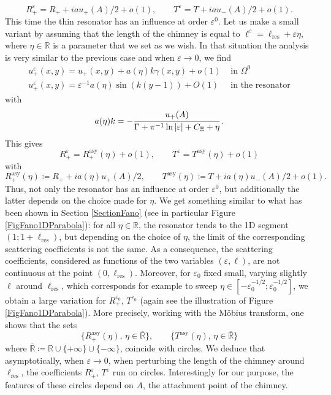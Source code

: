 \documentclass[11pt,a4paper]{report}
\newcommand{\eps}{\varepsilon}
\newcommand{\Om}{\Omega}
\newcommand{\mrm}[1]{\mathrm{#1}}
\newcommand{\R}{\mathbb{R}}
\begin{document}
\[
R_{+}^{\eps}=R_{+}+ia u_+(A)/2+o(1),\qquad T^{\eps}=T+iau_-(A)/2+o(1).
\]
This time the thin resonator has an influence at order $\eps^0$.  Let us make a small variant by assuming that the length of the chimney is equal to $\ell^\eps=\ell_{\mrm{res}}+\eps \eta$, where $\eta\in\R$ is a parameter that we set as we wish. In that situation the analysis is very similar to the previous case and when $\eps\to0$, we find
\begin{equation}\label{ResultAsymptoOut2}
\begin{array}{|ll}
u^{\eps}_+(x,y)=u_+(x,y)+a(\eta)k\gamma(x,y)+o(1) &\mbox{ in }\Om^0\\[4pt]
u^{\eps}_+(x,y)=\eps^{-1}a(\eta)\sin(k (y-1))+O(1) &\mbox{ in the resonator}
\end{array}
\end{equation}
with
\[
a(\eta) k=-\cfrac{u_+(A)}{\Gamma+\pi^{-1}\ln|\eps|+C_{\Xi}+\eta}\,.
\]
This gives
\begin{equation}\label{ExpansionsMainC}
R_{+}^{\eps}=R_{+}^{\mrm{asy}}(\eta)+o(1),\qquad T^{\eps}=T^{\mrm{asy}}(\eta)+o(1)
\end{equation}
with
\[
R_{+}^{\mrm{asy}}(\eta)\coloneqq R_{+}+ia(\eta)u_+(A)/2,\qquad T^{\mrm{asy}}(\eta)\coloneqq T+ia(\eta)u_-(A)/2+o(1).
\]
Thus, not only the resonator has an influence at order $\eps^0$, but additionally the latter depends on the choice made for $\eta$.  We get something similar to what has been shown in Section \ref{SectionFano} (see in particular Figure \ref{FigFano1DParabola}): for all $\eta\in\R$, the resonator tends to the 1D segment $(1;1+\ell_\mrm{res})$, but depending on the choice of $\eta$, the limit of the corresponding scattering coefficients is not the same. As a consequence, the scattering coefficients, considered as functions of the two variables $(\eps,\ell)$, are not continuous at the point $(0,\ell_\mrm{res})$. Moreover, for $\eps_0$ fixed small, varying slightly $\ell$ around $\ell_\mrm{res}$, which corresponds for example to sweep $\eta\in[-\eps_0^{-1/2};\eps_0^{-1/2}]$, we obtain a large variation for $R_{+}^{\eps_0}$, $T^{\eps_0}$ (again see the illustration of Figure \ref{FigFano1DParabola}). More precisely, working with the M\"{o}bius transform, one shows that the sets 
\[
\{R_{+}^{\mrm{asy}}(\eta),\,\eta\in\overline{\R}\},\qquad \{T^{\mrm{asy}}(\eta),\,\eta\in\overline{\R}\}
\]
where $\overline{\R}\coloneqq\R\cup\{+\infty\}\cup\{-\infty\}$, coincide with circles. We deduce that asymptotically, when $\eps\to0$, when perturbing the length of the chimney around $\ell_\mrm{res}$, the coefficients $R_{+}^{\eps}$, $T^{\eps}$ run on circles. Interestingly for our purpose, the features of these circles depend on $A$, the attachment point of the chimney.\\
\end{document}
